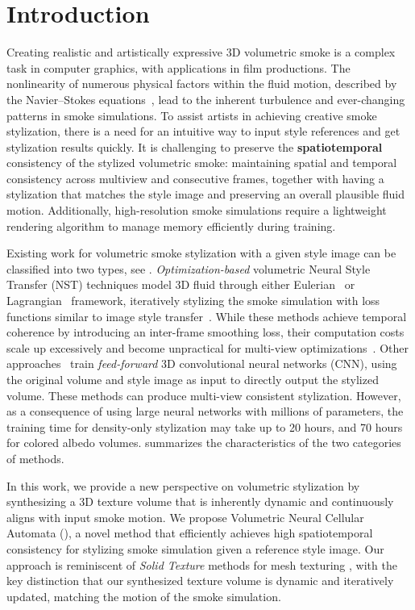 \section{Introduction}
Creating realistic and artistically expressive 3D volumetric smoke is a complex task in computer graphics, with applications in film productions. 
The nonlinearity of numerous physical factors within the fluid motion, described by the Navier–Stokes equations~\cite{bridson2015fluid}, lead to the inherent turbulence and ever-changing patterns in smoke simulations. 
To assist artists in achieving creative smoke stylization, there is a need for an intuitive way to input style references and get stylization results quickly. 
It is challenging to preserve the \textbf{spatiotemporal} consistency of the stylized volumetric smoke: maintaining spatial and temporal consistency across multiview and consecutive frames, together with having a stylization that matches the style image and preserving an overall plausible fluid motion. 
Additionally, high-resolution smoke simulations require a lightweight rendering algorithm to manage memory efficiently during training.





Existing work for volumetric smoke stylization with a given style image can be classified into two types, see . 
\textit{Optimization-based} volumetric Neural Style Transfer (NST) techniques model 3D fluid through either Eulerian~\cite{kim19c} or Lagrangian~\cite{kimlnst} framework, iteratively stylizing the smoke simulation with loss functions similar to image style transfer~\cite{gatys2016image}. 
While these methods achieve temporal coherence by introducing an inter-frame smoothing loss, their computation costs scale up excessively and become unpractical for multi-view optimizations~\cite{kanyuk2023singed}.  
Other approaches~\cite{guo2021volumetric, aurand2022efficient} train \textit{feed-forward} 3D convolutional neural networks (CNN), using the original volume and style image as input to directly output the stylized volume.
These methods can produce multi-view consistent stylization. 
However, as a consequence of using large neural networks with millions of parameters, the training time for density-only stylization may take up to 20 hours, and 70 hours for colored albedo volumes.
 summarizes the characteristics of the two categories of methods. 

In this work, we provide a new perspective on volumetric stylization by synthesizing a 3D texture volume that is inherently dynamic and continuously aligns with input smoke motion.
We propose Volumetric Neural Cellular Automata (\MethodName{}), a novel method that efficiently achieves high spatiotemporal consistency for stylizing smoke simulation given a reference style image. 
Our approach is reminiscent of \textit{Solid Texture} methods for mesh texturing \cite{on-demand-solid-texture, kopf2007solid, solid_textures}, with the key distinction that our synthesized texture volume is dynamic and iteratively updated, matching the motion of the smoke simulation. 


